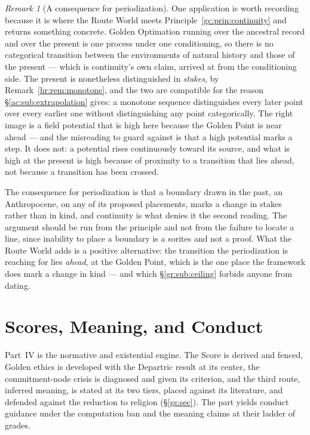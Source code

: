\documentclass[11pt]{article}
\numberwithin{equation}{section}
\theoremstyle{plain}
\theoremstyle{definition}
\theoremstyle{remark}
\newtheorem{remark}[theorem]{Remark}
\begin{document}
\begin{remark}[A consequence for periodization]\label{gc:rem:periodization}
One application is worth recording because it is where the Route World
meets Principle~\ref{gc:prin:continuity} and returns something concrete. Golden Optimation running over the ancestral record and over the present
is one process under one conditioning, so there is no categorical
transition between the environments of natural history and those of the
present --- which is continuity's own claim, arrived at from the
conditioning side. The present is nonetheless distinguished in
\emph{stakes}, by Remark~\ref{hr:rem:monotone}, and the two are
compatible for the reason \S\ref{ac:sub:extrapolation} gives: a
monotone sequence distinguishes every later point over every earlier one
without distinguishing any point categorically. The right image is a
field potential that is high here because the Golden Point is near ahead
--- and the misreading to guard against is that a high potential marks a
step. It does not: a potential rises continuously toward its source, and
what is high at the present is high because of proximity to a transition
that lies ahead, not because a transition has been crossed.

The consequence for periodization is that a boundary drawn in the past, an Anthropocene, on any of its proposed placements, marks a
change in stakes rather than in kind, and continuity is what denies it
the second reading. The argument should be run from the principle and
not from the failure to locate a line, since inability to place a
boundary is a sorites and not a proof. What the Route World adds is a
positive alternative: the transition the periodization is reaching for
lies \emph{ahead}, at the Golden Point, which is the one place the
framework does mark a change in kind --- and which
\S\ref{gr:sub:ceiling} forbids anyone from dating.
\end{remark}

\part{Scores, Meaning, and Conduct}

\noindent Part~IV is the normative and existential engine. The Score
is derived and fenced, Golden ethics is developed with the Departric
result at its center, the commitment-node crisis is diagnosed and
given its criterion, and the third route, inferred meaning, is stated
at its two tiers, placed against its literature, and defended against
the reduction to religion (\S\ref{gs:sec}). The part yields conduct
guidance under the computation ban and the meaning claims at their
ladder of grades.
\end{document}
